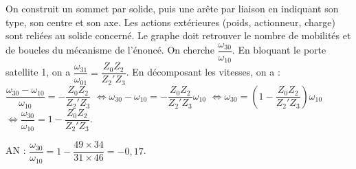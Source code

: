 \begin{corrigebox}
On construit un sommet par solide, puis une arête par liaison en
        indiquant son type, son centre et son axe. Les actions extérieures (poids,
        actionneur, charge) sont reliées au solide concerné. Le graphe doit retrouver le
        nombre de mobilités et de boucles du mécanisme de l'énoncé.
On cherche $\dfrac{\omega_{30}}{\omega_{10}}$. En bloquant le porte satellite 1, on a  
$\dfrac{\omega_{31}}{\omega_{01}}=\dfrac{Z_0 Z_2 }{Z_2' Z_3}$. En décomposant les vitesses, on a :
$\dfrac{\omega_{30}-\omega_{10}}{\omega_{10}}=-\dfrac{Z_0 Z_2 }{Z_2' Z_3}$
$\Leftrightarrow \omega_{30}-\omega_{10}=-\dfrac{Z_0 Z_2 }{Z_2' Z_3}\omega_{10}$
$\Leftrightarrow \omega_{30}=\left(1-\dfrac{Z_0 Z_2 }{Z_2' Z_3}\right)\omega_{10}$
$\Leftrightarrow \dfrac{\omega_{30}}{\omega_{10}}=1-\dfrac{Z_0 Z_2 }{Z_2' Z_3}$.

AN : $ \dfrac{\omega_{30}}{\omega_{10}}=1-\dfrac{49 \times 34}{31 \times 46}=-0,17$.
\end{corrigebox}
